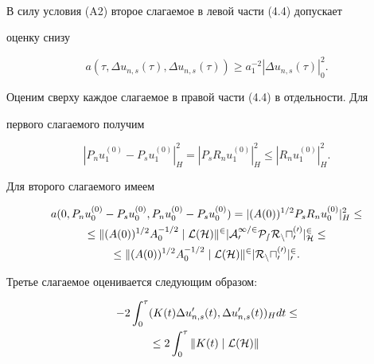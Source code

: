 \begin{pf}
\begin{multline}
\end{multline} 


В силу условия (A2) второе слагаемое в левой части (4.4) допускает 


оценку снизу 


\begin{equation} 


a(\tau,\Delta u_{n,s}(\tau),\Delta u_{n,s}(\tau))\ge 


a^{-2}_1|\Delta u_{n,s}(\tau)|^2_0. 


\end{equation} 


Оценим сверху каждое слагаемое в правой части (4.4) в отдельности. Для 


первого слагаемого получим 


\begin{equation} 


|P_n u^{(0)}_1-P_s u^{(0)}_1|^2_H=|P_s R_n u^{(0)}_1|^2_H\le 


|R_n u^{(0)}_1|^2_H. 


\end{equation} 


Для второго слагаемого имеем 


\begin{multline} 


a(0,P_n u^{(0)}_0-P_s u^{(0)}_0, P_n u^{(0)}_0-P_s u^{(0)}_0)= 


|(A(0))^{1/2}P_s R_n u^{(0)}_0|^2_H\le \\ 


% 


\le \|(A(0))^{1/2}A^{-1/2}_0\mid\cal L(H)\|^2 


|A^{1/2}_0 P_s R_n u^{(0)}_0|^2_H \le \\ 


% 


\le \|(A(0))^{1/2}A^{-1/2}_0\mid\cal L(H)\|^2 


|R_n u^{(0)}_0|^2_0. 


\end{multline} 


Третье слагаемое оценивается следующим образом:


\begin{multline} 


-2\int^\tau_0(K(t)\Delta u'_{n,s}(t),\Delta u'_{n,s}(t))_H dt \le \\


% 


\le 2\int^\tau_0\|K(t)\mid\cal L(H)\|\, 



\end{multline}
\end{pf}

